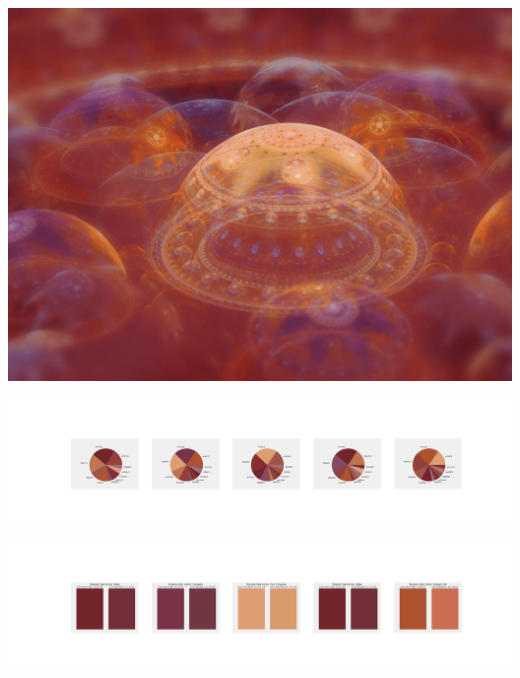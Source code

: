 \documentclass[11pt]{article}
\begin{document}
\begin{landscape}
    \begin{center}
    \includegraphics[width=\textwidth]{./nbimg/file (173).jpg}
    \end{center}

    \begin{center}
    \includegraphics[width=250mm]{./nbimg/pie-82.jpg}
    \end{center}

    \begin{center}
    \includegraphics[width=250mm]{./nbimg/peak-82.jpg}
    \end{center}
    


\end{landscape}
\end{document}
